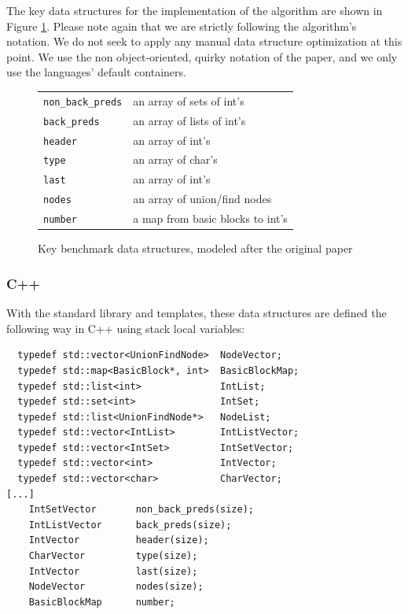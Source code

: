 The key data structures for the implementation of the algorithm are
shown in Figure \ref{datastructs}. Please note again that we are
strictly following the algorithm's notation. We do not seek to apply
any manual data structure optimization at this point. We use the
non object-oriented, quirky notation of the paper, and we only
use the languages' default containers.

\begin{figure}
\begin{tabular}{ll}
{\tt\small non\_back\_preds} & an array of sets of int's  \\
{\tt\small back\_preds} & an array of lists of int's  \\
{\tt\small header} & an array of int's \\
{\tt\small type  } & an array of char's  \\
{\tt\small last  } & an array of int's \\
{\tt\small nodes } & an array of union/find nodes \\
{\tt\small number} & a map from basic blocks to int's \\
\end{tabular}
\caption{Key benchmark data structures, modeled after the original paper}
\label{datastructs}
\end{figure}

\subsubsection{C++} 
With the standard library and templates, these data structures are defined the following way in C++ using stack local variables:

\begin{footnotesize}
\begin{verbatim}
  typedef std::vector<UnionFindNode>  NodeVector;
  typedef std::map<BasicBlock*, int>  BasicBlockMap;
  typedef std::list<int>              IntList;
  typedef std::set<int>               IntSet;
  typedef std::list<UnionFindNode*>   NodeList;
  typedef std::vector<IntList>        IntListVector;
  typedef std::vector<IntSet>         IntSetVector;
  typedef std::vector<int>            IntVector;
  typedef std::vector<char>           CharVector;
[...]
    IntSetVector       non_back_preds(size);
    IntListVector      back_preds(size);
    IntVector          header(size);
    CharVector         type(size);
    IntVector          last(size);
    NodeVector         nodes(size);
    BasicBlockMap      number;
\end{verbatim}
\end{footnotesize}

